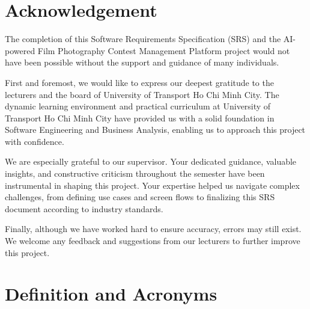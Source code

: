 \documentclass[12pt,a4paper]{article}
\begin{document}
\newpage

\setcounter{page}{2}

\begingroup
\setcounter{tocdepth}{5}
\renewcommand{\contentsname}{\centering Contents}
\tableofcontents
\endgroup
\newpage

\begingroup
\setlength{\parindent}{1.5em}
\setlength{\parskip}{0.8em}
\section*{Acknowledgement}

The completion of this Software Requirements Specification (SRS) and the AI-powered Film Photography Contest Management Platform project would not have been possible without the support and guidance of many individuals.

First and foremost, we would like to express our deepest gratitude to the lecturers and the board of University of Transport Ho Chi Minh City. The dynamic learning environment and practical curriculum at University of Transport Ho Chi Minh City have provided us with a solid foundation in Software Engineering and Business Analysis, enabling us to approach this project with confidence.

We are especially grateful to our supervisor. Your dedicated guidance, valuable insights, and constructive criticism throughout the semester have been instrumental in shaping this project. Your expertise helped us navigate complex challenges, from defining use cases and screen flows to finalizing this SRS document according to industry standards.

Finally, although we have worked hard to ensure accuracy, errors may still exist. We welcome any feedback and suggestions from our lecturers to further improve this project.
\endgroup

\section*{Definition and Acronyms}
\end{document}
